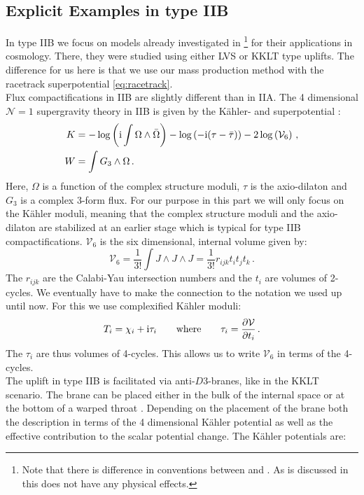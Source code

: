 \documentclass[a4paper,12pt]{report}
\newcommand{\be}{\begin{equation}}
\newcommand{\ee}{\end{equation}}
\newcommand{\bea}{\begin{equation}\begin{aligned}}
\newcommand{\eea}{\end{aligned}\end{equation}}
\def\rmi{{\rm i}}
\begin{document}
\subsection{Explicit Examples in type IIB}
In type IIB we focus on models already investigated in \cite{Cicoli:2008va,Cicoli:2008gp,Burgess:2016owb,Kallosh:2017wku,Bobkov:2010rf}\footnote{Note that there is difference in conventions between \cite{Cicoli:2008va,Cicoli:2008gp,Burgess:2016owb,Kallosh:2017wku,Bobkov:2010rf} and \cite{Cribiori:2019drf}. As is discussed in \cite{Cribiori:2019drf} this does not have any physical effects.}  for their applications in cosmology. There, they were studied using either LVS or KKLT type uplifts. The difference for us here is that we use our mass production method with the racetrack superpotential \eqref{eq:racetrack}.\\
Flux compactifications in IIB are slightly different than in IIA. The 4 dimensional $\mathcal{N}=1$ supergravity theory in IIB is given by the Kähler- and superpotential \cite{Grimm:2004uq}:
\bea 
K &= -\log\left(\rmi \int \Omega \wedge \bar{\Omega} \right) - \log\left(-\rmi (\tau -\bar{\tau})\right) - 2 \log \left(\mathcal{V}_6\right)\,,\\
W &= \int G_3 \wedge \Omega\,.
\eea
Here, $\Omega$ is a function of the complex structure moduli, $\tau$ is the axio-dilaton and $G_3$ is a complex 3-form flux. For our purpose in this part we will only focus on the Kähler moduli, meaning that the complex structure moduli and the axio-dilaton are stabilized at an earlier stage which is typical for type IIB compactifications. $\mathcal{V}_6$ is the six dimensional, internal volume given by:
\be 
\mathcal{V}_6 = \frac{1}{3!} \int J \wedge J \wedge J=\frac{1}{3!} r_{ijk}t_i t_j t_k\,.
\ee
The $r_{ijk}$ are the Calabi-Yau intersection numbers and the $t_i$ are volumes of 2-cycles. We eventually have to make the connection to the notation we used up until now. For this we use complexified Kähler moduli:
\be 
T_i = \chi_i + \rmi \tau_i \qquad \text{where} \qquad \tau_i = \frac{\partial \mathcal{V}}{\partial t_i}\,.
\ee
The $\tau_i$ are thus volumes of 4-cycles. This allows us to write $\mathcal{V}_6$ in terms of the 4-cycles.\\
The uplift in type IIB is facilitated via anti-$D3$-branes, like in the KKLT scenario. The brane can be placed either in the bulk of the internal space or at the bottom of a warped throat \cite{Kallosh:2017wku}. Depending on the placement of the brane both the description in terms of the 4 dimensional Kähler potential as well as the effective contribution to the scalar potential change. The Kähler potentials are:
\end{document}

